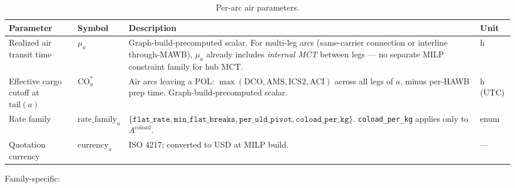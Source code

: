 \documentclass[11pt,a4paper]{article}
\theoremstyle{definition}
\begin{document}
\begin{table}[H]
\centering
\caption{Per-arc air parameters.}
\label{tab:air-arc-params}
\begin{tabular}{p{3cm}p{2.2cm}p{7cm}p{1.5cm}}
\toprule
Parameter & Symbol & Description & Unit \\
\midrule
Realized air transit time & $\mu_a$ & Graph-build-precomputed scalar. For multi-leg arcs (same-carrier connection or interline through-MAWB), $\mu_a$ already includes \emph{internal MCT} between legs --- no separate MILP constraint family for hub MCT. & h \\
Effective cargo cutoff at $\text{tail}(a)$ & $\text{CO}_a^*$ & Air arcs leaving a POL: $\max(\text{DCO}, \text{AMS}, \text{ICS2}, \text{ACI})$ across all legs of $a$, minus per-HAWB prep time. Graph-build-precomputed scalar. & h (UTC) \\
Rate family & $\text{rate\_family}_a$ & $\{\texttt{flat\_rate}, \texttt{min\_flat\_breaks}, \texttt{per\_uld\_pivot}, \texttt{coload\_per\_kg}\}$. \texttt{coload\_per\_kg} applies only to $A^{\text{coload}}$. & enum \\
Quotation currency & $\text{currency}_a$ & ISO 4217; converted to USD at MILP build. & --- \\
\bottomrule
\end{tabular}
\end{table}

Family-specific:
\end{document}
